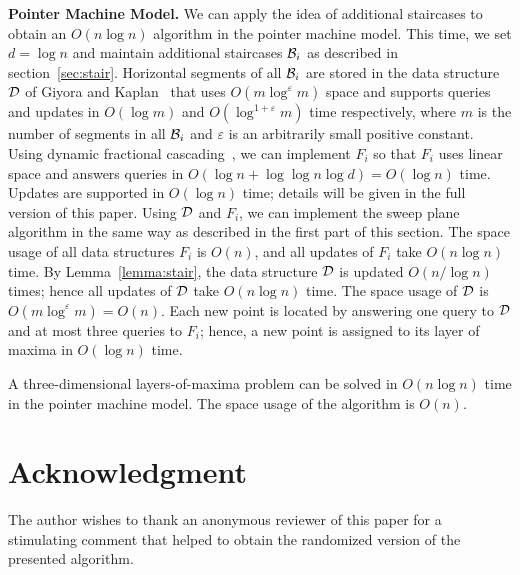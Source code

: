 \documentclass[10pt]{llncs}
\newcommand{\cD}{{\cal D}}
\newcommand{\cB}{{\cal B}}
\newcommand{\eps}{\varepsilon}
\begin{document}
{\bf Pointer Machine Model.}
We can apply the idea of additional staircases to obtain  
an $O(n\log n)$ algorithm in the pointer machine model. This time, we set 
$d=\log n $ and maintain additional staircases $\cB_i$ as described 
in section~\ref{sec:stair}.
Horizontal  segments of all $\cB_i$ are stored in the data 
structure $\cD$ of Giyora and Kaplan~\cite{GK09} that uses 
$O(m\log^{\eps} m)$ space and
supports queries and updates in $O(\log m)$ and $O(\log^{1+\eps} m)$ 
time respectively, where $m$ is the number of segments 
in all $\cB_i$ and $\eps$ is an arbitrarily small  positive constant. 
Using dynamic fractional cascading~\cite{MN90}, we can implement $F_i$ so that 
$F_i$ uses linear space and answers queries 
in $O(\log n + \log \log n \log d)= O(\log n)$ time.
Updates are supported in $O(\log n)$ time; 
details will be given in the 
full version of this paper. 
Using $\cD$ and $F_i$, we can implement the 
sweep plane algorithm in the same way as described in the 
first part of this section. The space usage of all data structures 
$F_i$ is $O(n)$, and all updates of $F_i$ take $O(n\log n)$ time. 
By Lemma~\ref{lemma:stair}, the data structure $\cD$ is updated 
$O(n/\log n)$ times; hence all updates of $\cD$ take $O(n\log n)$ time. 
The space usage of $\cD$ is $O(m\log^{\eps} m)= O(n)$. 
Each new point is located by answering one query to $\cD$ and at 
most three queries to $F_i$; hence, a new point is assigned 
to its layer of maxima in $O(\log n)$ time. 
\begin{theorem}
A three-dimensional layers-of-maxima problem can be solved in 
$O(n  \log n)$ time in the pointer machine model. The space usage of
 the algorithm is $O(n)$.
\end{theorem}


\section*{Acknowledgment}
The author wishes to thank an anonymous reviewer of this paper for a 
stimulating comment that helped to obtain the randomized version 
of the presented algorithm. 
\end{document}
